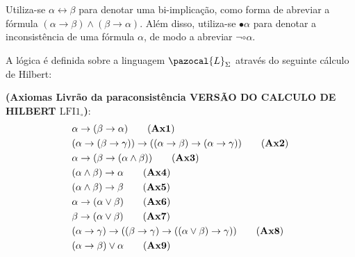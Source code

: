 \begin{notacao}
    Utiliza-se $\alpha \leftrightarrow \beta$ para denotar uma bi-implicação, como forma de abreviar a fórmula $(\alpha \rightarrow \beta) \land (\beta \rightarrow \alpha)$. Além disso, utiliza-se $\bullet \alpha$ para denotar a inconsistência de uma fórmula $\alpha$, de modo a abreviar $\neg \circ \alpha$.
\end{notacao}

\begin{definicao}[\lfium{}]
    \label{def:lfi1}
    A lógica \lfium{} é definida sobre a linguagem $\pazocal{L}_{\Sigma}$ através do seguinte cálculo de Hilbert:

    \noindent\textbf{(Axiomas Livrão da paraconsistência VERSÃO DO CALCULO DE HILBERT $\text{LFI1}_{\circ}$)}:
    \begin{align*}
        & \alpha \rightarrow (\beta \rightarrow \alpha)\tag{\textbf{Ax1}}                                                                                     \\
        & (\alpha \rightarrow (\beta \rightarrow \gamma)) \rightarrow ((\alpha \rightarrow \beta) \rightarrow (\alpha \rightarrow \gamma ))\tag{\textbf{Ax2}} \\
        & \alpha \rightarrow (\beta \rightarrow (\alpha \land \beta))\tag{\textbf{Ax3}}                                                                       \\
        & (\alpha \land \beta) \rightarrow \alpha\tag{\textbf{Ax4}}                                                                                           \\
        & (\alpha \land \beta) \rightarrow \beta\tag{\textbf{Ax5}}                                                                                            \\
        & \alpha \rightarrow (\alpha \lor \beta)\tag{\textbf{Ax6}}                                                                                            \\
        & \beta \rightarrow (\alpha \lor \beta)\tag{\textbf{Ax7}}                                                                                             \\
        & (\alpha \rightarrow \gamma) \rightarrow ((\beta \rightarrow \gamma) \rightarrow ((\alpha \lor \beta) \rightarrow \gamma))\tag{\textbf{Ax8}}         \\
        & (\alpha \rightarrow \beta) \lor \alpha\tag{\textbf{Ax9}}                                                                                           \\

\end{align*}
\end{definicao}
